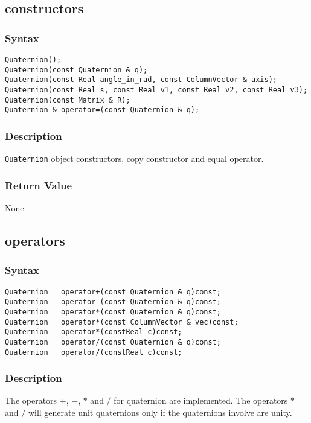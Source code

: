 \documentclass[11pt,fleqn,letterpaper]{report}
\begin{document}
\subsection*{constructors}

\subsubsection*{Syntax}
\begin{verbatim}
Quaternion();
Quaternion(const Quaternion & q);
Quaternion(const Real angle_in_rad, const ColumnVector & axis);
Quaternion(const Real s, const Real v1, const Real v2, const Real v3);
Quaternion(const Matrix & R);
Quaternion & operator=(const Quaternion & q);
\end{verbatim}
\subsubsection{Description}
\texttt{Quaternion} object constructors, copy constructor and equal operator.

\subsubsection*{Return Value}

None

\newpage

\subsection*{operators}

\subsubsection*{Syntax}
\begin{verbatim}
Quaternion   operator+(const Quaternion & q)const;
Quaternion   operator-(const Quaternion & q)const;
Quaternion   operator*(const Quaternion & q)const;
Quaternion   operator*(const ColumnVector & vec)const;
Quaternion   operator*(constReal c)const;
Quaternion   operator/(const Quaternion & q)const;
Quaternion   operator/(constReal c)const;
\end{verbatim}
\subsubsection{Description}
The operators $+$, $-$, $*$ and $/$ for quaternion are
implemented.
The operators $*$ and $/$ will generate unit quaternions 
only if the quaternions involve are unity.
\end{document}
